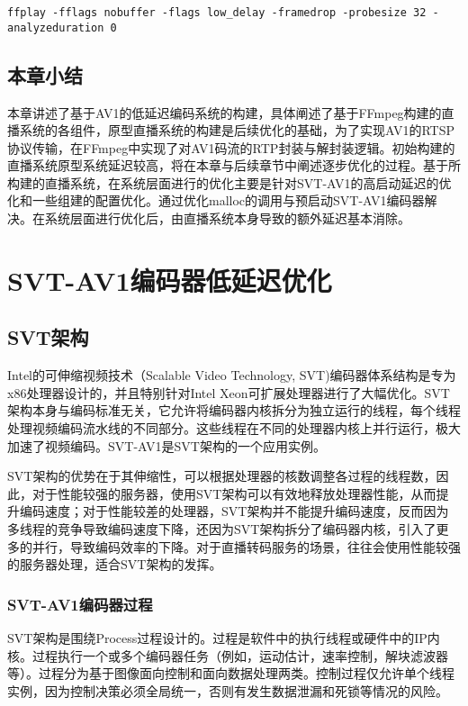 	\texttt{ffplay -fflags nobuffer -flags low\_delay -framedrop -probesize 32 -analyzeduration 0}
\section{本章小结}
  本章讲述了基于AV1的低延迟编码系统的构建，具体阐述了基于FFmpeg构建的直播系统的各组件，原型直播系统的构建是后续优化的基础，为了实现AV1的RTSP协议传输，在FFmpeg中实现了对AV1码流的RTP封装与解封装逻辑。初始构建的直播系统原型系统延迟较高，将在本章与后续章节中阐述逐步优化的过程。基于所构建的直播系统，在系统层面进行的优化主要是针对SVT-AV1的高启动延迟的优化和一些组建的配置优化。通过优化malloc的调用与预启动SVT-AV1编码器解决。在系统层面进行优化后，由直播系统本身导致的额外延迟基本消除。


\chapter{SVT-AV1编码器低延迟优化}

\section{SVT架构}
  Intel的可伸缩视频技术（Scalable Video Technology, SVT\cite{ScalableVideoTechnology2019})编码器体系结构是专为x86处理器设计的，并且特别针对Intel Xeon可扩展处理器进行了大幅优化。SVT架构本身与编码标准无关，它允许将编码器内核拆分为独立运行的线程，每个线程处理视频编码流水线的不同部分。这些线程在不同的处理器内核上并行运行，极大加速了视频编码。SVT-AV1是SVT架构的一个应用实例。

  SVT架构的优势在于其伸缩性，可以根据处理器的核数调整各过程的线程数，因此，对于性能较强的服务器，使用SVT架构可以有效地释放处理器性能，从而提升编码速度；对于性能较差的处理器，SVT架构并不能提升编码速度，反而因为多线程的竞争导致编码速度下降，还因为SVT架构拆分了编码器内核，引入了更多的并行，导致编码效率的下降。对于直播转码服务的场景，往往会使用性能较强的服务器处理，适合SVT架构的发挥。

\subsection{SVT-AV1编码器过程}
  SVT架构是围绕Process过程设计的\cite{EncoderDesignSVTAV1}。过程是软件中的执行线程或硬件中的IP内核。过程执行一个或多个编码器任务（例如，运动估计，速率控制，解块滤波器等）。过程分为基于图像面向控制和面向数据处理两类。控制过程仅允许单个线程实例，因为控制决策必须全局统一，否则有发生数据泄漏和死锁等情况的风险。

